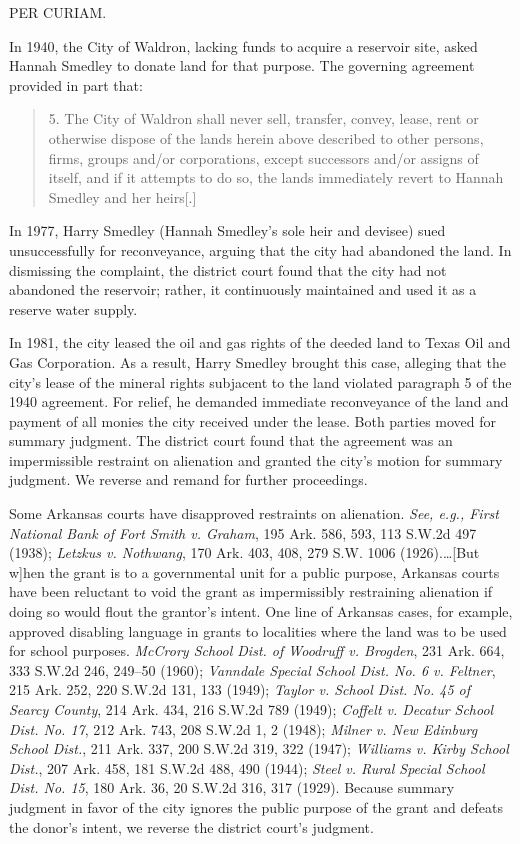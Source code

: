 

PER CURIAM.

In 1940, the City of Waldron, lacking funds to acquire a reservoir site, asked
Hannah Smedley to donate land for that purpose. The governing agreement
provided in part that:
\begin{quote}
5. The City of Waldron shall never sell, transfer, convey, lease, rent or
otherwise dispose of the lands herein above described to other persons, firms,
groups and/or corporations, except successors and/or assigns of itself, and if
it attempts to do so, the lands immediately revert to Hannah Smedley and her
heirs[.]
\end{quote}

In 1977, Harry Smedley (Hannah Smedley's sole heir and devisee) sued
unsuccessfully for reconveyance, arguing that the city had abandoned the land.
In dismissing the complaint, the district court found that the city had not
abandoned the reservoir; rather, it continuously maintained and used it as a
reserve water supply.

In 1981, the city leased the oil and gas rights of the deeded land to Texas Oil
and Gas Corporation. As a result, Harry Smedley brought this case, alleging
that the city's lease of the mineral rights subjacent to the land violated
paragraph 5 of the 1940 agreement. For relief, he demanded immediate
reconveyance of the land and payment of all monies the city received under the
lease. Both parties moved for summary judgment. The district court found that
the agreement was an impermissible restraint on alienation and granted the
city's motion for summary judgment. We reverse and remand for further
proceedings.

Some Arkansas courts have disapproved restraints on alienation. \textit{See,
e.g., First National Bank of Fort Smith v. Graham}, 195 Ark. 586, 593, 113
S.W.2d 497 (1938); \textit{Letzkus v. Nothwang}, 170 Ark. 403, 408, 279 S.W.
1006 (1926).\dots [But w]hen the grant is to a governmental unit for a
public purpose, Arkansas courts have been reluctant to void the grant as
impermissibly restraining alienation if doing so would flout the grantor's
intent. One line of Arkansas cases, for example, approved disabling language in
grants to localities where the land was to be used for school purposes.
\textit{McCrory School Dist. of Woodruff v. Brogden}, 231 Ark. 664, 333 S.W.2d
246, 249--50 (1960); \textit{Vanndale Special School Dist. No. 6 v. Feltner},
215 Ark. 252, 220 S.W.2d 131, 133 (1949); \textit{Taylor v. School Dist. No. 45
of Searcy County}, 214 Ark. 434, 216 S.W.2d 789 (1949); \textit{Coffelt v.
Decatur School Dist. No. 17}, 212 Ark. 743, 208 S.W.2d 1, 2 (1948);
\textit{Milner v. New Edinburg School Dist.}, 211 Ark. 337, 200 S.W.2d 319, 322
(1947); \textit{Williams v. Kirby School Dist.}, 207 Ark. 458, 181 S.W.2d 488,
490 (1944); \textit{Steel v. Rural Special School Dist. No. 15}, 180 Ark. 36,
20 S.W.2d 316, 317 (1929). Because summary judgment in favor of the city
ignores the public purpose of the grant and defeats the donor's intent, we
reverse the district court's judgment.

